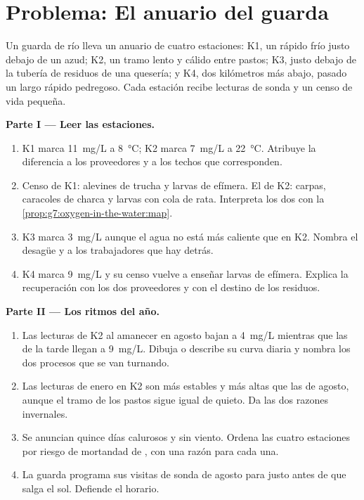 \section{Problema: El anuario del guarda}

\begin{problem}\label{pb:g7:oxygen-in-the-water:1}
Un guarda de río lleva un anuario de cuatro estaciones: K1, un rápido
frío justo debajo de un azud; K2, un tramo lento y cálido entre pastos;
K3, justo debajo de la tubería de residuos de una quesería; y K4, dos
kilómetros más abajo, pasado un largo rápido pedregoso. Cada estación
recibe lecturas de sonda y un censo de vida pequeña.

\medskip\noindent\textbf{Parte I --- Leer las estaciones.}
\begin{enumerate}
  \item K1 marca \qty{11}{mg/L} a \qty{8}{\degreeCelsius}; K2 marca
        \qty{7}{mg/L} a \qty{22}{\degreeCelsius}. Atribuye la
        diferencia a los proveedores y a los techos que corresponden.
  \item Censo de K1: alevines de trucha y larvas de efímera. El de K2:
        carpas, caracoles de charca y larvas con cola de rata.
        Interpreta los dos con la
        \cref{prop:g7:oxygen-in-the-water:map}.
  \item K3 marca \qty{3}{mg/L} aunque el agua no está más caliente que
        en K2. Nombra el desagüe y a los trabajadores que hay detrás.
  \item K4 marca \qty{9}{mg/L} y su censo vuelve a enseñar larvas de
        efímera. Explica la recuperación con los dos proveedores y con
        el destino de los residuos.
\end{enumerate}

\medskip\noindent\textbf{Parte II --- Los ritmos del año.}
\begin{enumerate}[resume]
  \item Las lecturas de K2 al amanecer en agosto bajan a \qty{4}{mg/L}
        mientras que las de la tarde llegan a \qty{9}{mg/L}. Dibuja o
        describe su curva diaria y nombra los dos procesos que se van
        turnando.
  \item Las lecturas de enero en K2 son más estables y más altas que
        las de agosto, aunque el tramo de los pastos sigue igual de
        quieto. Da las dos razones invernales.
  \item Se anuncian quince días calurosos y sin viento. Ordena las
        cuatro estaciones por riesgo de mortandad de , con una
        razón para cada una.
  \item La guarda programa sus visitas de sonda de agosto para justo
        antes de que salga el sol. Defiende el horario.
\end{enumerate}


\end{problem}
